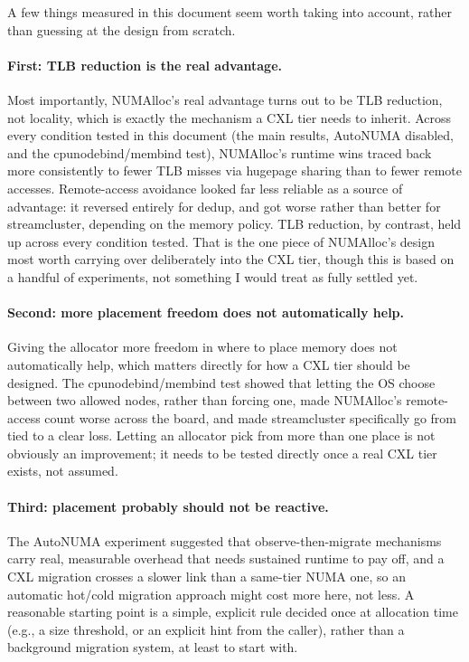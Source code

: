 \documentclass[11pt,a4paper]{article}
\begin{document}
A few things measured in this document seem worth taking into account, rather than guessing at the design from scratch.

\paragraph{First: TLB reduction is the real advantage.}
Most importantly, NUMAlloc's real advantage turns out to be TLB reduction, not locality, which is exactly the mechanism a CXL tier needs to inherit. Across every condition tested in this document (the main results, AutoNUMA disabled, and the cpunodebind/membind test), NUMAlloc's runtime wins traced back more consistently to fewer TLB misses via hugepage sharing than to fewer remote accesses. Remote-access avoidance looked far less reliable as a source of advantage: it reversed entirely for dedup, and got worse rather than better for streamcluster, depending on the memory policy. TLB reduction, by contrast, held up across every condition tested. That is the one piece of NUMAlloc's design most worth carrying over deliberately into the CXL tier, though this is based on a handful of experiments, not something I would treat as fully settled yet.

\paragraph{Second: more placement freedom does not automatically help.}
Giving the allocator more freedom in where to place memory does not automatically help, which matters directly for how a CXL tier should be designed. The cpunodebind/membind test showed that letting the OS choose between two allowed nodes, rather than forcing one, made NUMAlloc's remote-access count worse across the board, and made streamcluster specifically go from tied to a clear loss. Letting an allocator pick from more than one place is not obviously an improvement; it needs to be tested directly once a real CXL tier exists, not assumed.

\paragraph{Third: placement probably should not be reactive.}
The AutoNUMA experiment suggested that observe-then-migrate mechanisms carry real, measurable overhead that needs sustained runtime to pay off, and a CXL migration crosses a slower link than a same-tier NUMA one, so an automatic hot/cold migration approach might cost more here, not less. A reasonable starting point is a simple, explicit rule decided once at allocation time (e.g., a size threshold, or an explicit hint from the caller), rather than a background migration system, at least to start with.
\end{document}
